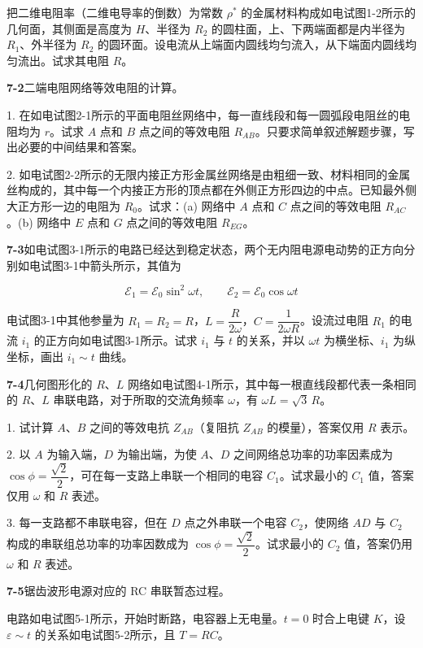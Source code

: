 把二维电阻率（二维电导率的倒数）为常数 $\rho^{*}$ 的金属材料构成如电试图1-2所示的几何面，其侧面是高度为 $H$、半径为 $R_{2}$ 的圆柱面，上、下两端面都是内半径为 $R_{1}$、外半径为 $R_{2}$ 的圆环面。设电流从上端面内圆线均匀流入，从下端面内圆线均匀流出。试求其电阻 $R$。
\vfill

\newpage
\textbf{7-2}\quad 二端电阻网络等效电阻的计算。

1. 在如电试图2-1所示的平面电阻丝网络中，每一直线段和每一圆弧段电阻丝的电阻均为 $r$。试求 $A$ 点和 $B$ 点之间的等效电阻 $R_{AB}$。只要求简单叙述解题步骤，写出必要的中间结果和答案。


2. 如电试图2-2所示的无限内接正方形金属丝网络是由粗细一致、材料相同的金属丝构成的，其中每一个内接正方形的顶点都在外侧正方形四边的中点。已知最外侧大正方形一边的电阻为 $R_{0}$。试求：(a) 网络中 $A$ 点和 $C$ 点之间的等效电阻 $R_{AC}$。(b) 网络中 $E$ 点和 $G$ 点之间的等效电阻 $R_{EG}$。
\vfill

\textbf{7-3}\quad 如电试图3-1所示的电路已经达到稳定状态，两个无内阻电源电动势的正方向分别如电试图3-1中箭头所示，其值为


$$
\mathcal{E}_{1} = \mathcal{E}_{0}\sin^{2}\omega t,\qquad \mathcal{E}_{2} = \mathcal{E}_{0}\cos\omega t
$$

电试图3-1中其他参量为 $R_{1} = R_{2} = R$，$L = \dfrac{R}{2\omega}$，$C = \dfrac{1}{2\omega R}$。设流过电阻 $R_{1}$ 的电流 $i_{1}$ 的正方向如电试图3-1所示。试求 $i_{1}$ 与 $t$ 的关系，并以 $\omega t$ 为横坐标、$i_{1}$ 为纵坐标，画出 $i_{1} \sim t$ 曲线。
\vfill

\newpage
\textbf{7-4}\quad 几何图形化的 $R$、$L$ 网络如电试图4-1所示，其中每一根直线段都代表一条相同的 $R$、$L$ 串联电路，对于所取的交流角频率 $\omega$，有 $\omega L = \sqrt{3}\,R$。


1. 试计算 $A$、$B$ 之间的等效电抗 $Z_{AB}$（复阻抗 $Z_{AB}$ 的模量），答案仅用 $R$ 表示。

2. 以 $A$ 为输入端，$D$ 为输出端，为使 $A$、$D$ 之间网络总功率的功率因素成为 $\cos\phi = \dfrac{\sqrt{2}}{2}$，可在每一支路上串联一个相同的电容 $C_{1}$。试求最小的 $C_{1}$ 值，答案仅用 $\omega$ 和 $R$ 表述。

3. 每一支路都不串联电容，但在 $D$ 点之外串联一个电容 $C_{2}$，使网络 $AD$ 与 $C_{2}$ 构成的串联组总功率的功率因数成为 $\cos\phi = \dfrac{\sqrt{2}}{2}$。试求最小的 $C_{2}$ 值，答案仍用 $\omega$ 和 $R$ 表述。
\vfill

\textbf{7-5}\quad 锯齿波形电源对应的 RC 串联暂态过程。

电路如电试图5-1所示，开始时断路，电容器上无电量。$t = 0$ 时合上电键 $K$，设 $\varepsilon \sim t$ 的关系如电试图5-2所示，且 $T = RC$。


